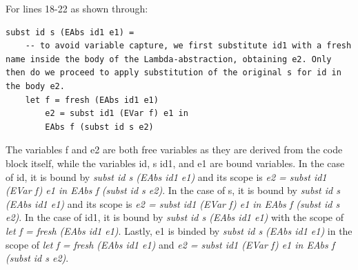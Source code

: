 \documentclass{article}
\theoremstyle{theorem}
\theoremstyle{definition}
\theoremstyle{remark}
\begin{document}
For lines 18-22 as shown through:
\begin{lstlisting}
subst id s (EAbs id1 e1) =
    -- to avoid variable capture, we first substitute id1 with a fresh name inside the body of the Lambda-abstraction, obtaining e2. Only then do we proceed to apply substitution of the original s for id in the body e2.
    let f = fresh (EAbs id1 e1)
        e2 = subst id1 (EVar f) e1 in
        EAbs f (subst id s e2)
\end{lstlisting}
The variables f and e2 are both free variables as they are derived from the code block itself, while the variables id, s id1, and e1 are bound variables. In the case of id, it is bound by \textit{subst id s (EAbs id1 e1)} and its scope is \textit{e2 = subst id1 (EVar f) e1 in EAbs f (subst id s e2)}. In the case of s, it is bound by \textit{subst id s (EAbs id1 e1)} and its scope is \textit{e2 = subst id1 (EVar f) e1 in EAbs f (subst id s e2)}. In the case of id1, it is bound by \textit{subst id s (EAbs id1 e1)} with the scope of \textit{let f = fresh (EAbs id1 e1)}. Lastly, e1 is binded by \textit{subst id s (EAbs id1 e1)} in the scope of \textit{let f = fresh (EAbs id1 e1)} and \textit{e2 = subst id1 (EVar f) e1 in EAbs f (subst id s e2)}.
\end{document}
